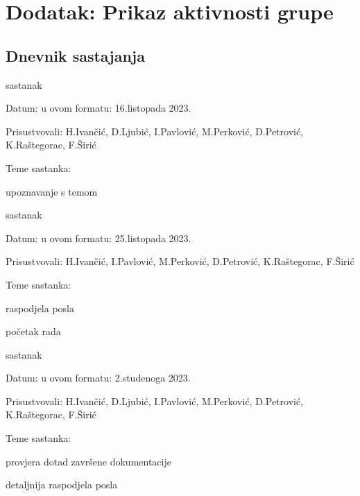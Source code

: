\chapter*{Dodatak: Prikaz aktivnosti grupe}
		
		\section*{Dnevnik sastajanja}

		\begin{packed_enum}
			\item  sastanak
			
			\item[] \begin{packed_item}
				\item Datum: u ovom formatu: 16.listopada 2023.
				\item Prisustvovali: H.Ivančić, D.Ljubić, I.Pavlović, M.Perković, D.Petrović, K.Raštegorac, F.Širić
				\item Teme sastanka:
				\begin{packed_item}
					\item  upoznavanje s temom
				\end{packed_item}
			\end{packed_item}
			
			\item  sastanak
			\item[] \begin{packed_item}
				\item Datum: u ovom formatu: 25.listopada 2023.
				\item Prisustvovali: H.Ivančić, I.Pavlović, M.Perković, D.Petrović, K.Raštegorac, F.Širić
				\item Teme sastanka:
				\begin{packed_item}
					\item  raspodjela posla
					\item  početak rada
				\end{packed_item}
			\end{packed_item}
			
			\item  sastanak
			\item[] \begin{packed_item}
				\item Datum: u ovom formatu: 2.studenoga 2023.
				\item Prisustvovali: H.Ivančić, D.Ljubić, I.Pavlović, M.Perković, D.Petrović, K.Raštegorac, F.Širić
				\item Teme sastanka:
				\begin{packed_item}
					\item  provjera dotad završene dokumentacije
					\item detaljnija raspodjela posla
				\end{packed_item}
			\end{packed_item}
			

\end{packed_enum}
